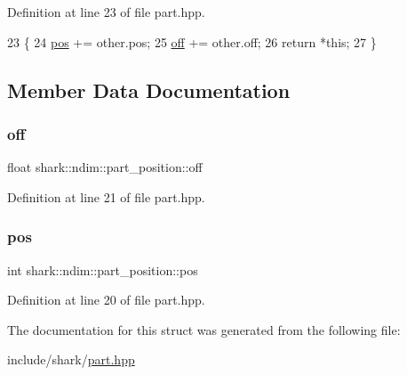 Definition at line 23 of file part.\+hpp.


\begin{DoxyCode}
23                                                                               \{
24                             \hyperlink{structshark_1_1ndim_1_1part__position_abbc439e94001c9f96cc8985d683e24e0}{pos} += other.pos;
25                             \hyperlink{structshark_1_1ndim_1_1part__position_a914e3d4214109e716fcfd06a46e07810}{off} += other.off;
26                             \textcolor{keywordflow}{return} *\textcolor{keyword}{this};
27                         \}
\end{DoxyCode}


\subsection{Member Data Documentation}
\hypertarget{structshark_1_1ndim_1_1part__position_a914e3d4214109e716fcfd06a46e07810}{}\label{structshark_1_1ndim_1_1part__position_a914e3d4214109e716fcfd06a46e07810} 
\subsubsection{\texorpdfstring{off}{off}}
{\footnotesize\ttfamily float shark\+::ndim\+::part\+\_\+position\+::off}



Definition at line 21 of file part.\+hpp.

\hypertarget{structshark_1_1ndim_1_1part__position_abbc439e94001c9f96cc8985d683e24e0}{}\label{structshark_1_1ndim_1_1part__position_abbc439e94001c9f96cc8985d683e24e0} 
\subsubsection{\texorpdfstring{pos}{pos}}
{\footnotesize\ttfamily int shark\+::ndim\+::part\+\_\+position\+::pos}



Definition at line 20 of file part.\+hpp.



The documentation for this struct was generated from the following file\+:\begin{DoxyCompactItemize}
\item 
include/shark/\hyperlink{part_8hpp}{part.\+hpp}\end{DoxyCompactItemize}
